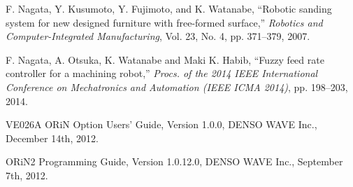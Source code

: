\documentclass{suribt}
\begin{document}
\begin{thebibliography}{}

F. Nagata, Y. Kusumoto, Y. Fujimoto, and K. Watanabe, ``Robotic sanding system for new designed furniture with free-formed surface,''
{\it Robotics and Computer-Integrated Manufacturing},
Vol. 23, No. 4, pp. 371--379, 2007.

F. Nagata, A. Otsuka, K. Watanabe and Maki K. Habib, ``Fuzzy feed rate controller for a machining robot,'' {\it Procs. of the 2014 IEEE International Conference on Mechatronics and Automation (IEEE ICMA 2014)}, pp. 198--203, 2014.


VE026A ORiN Option Users' Guide, Version 1.0.0, DENSO WAVE Inc., December 14th, 2012.

ORiN2 Programming Guide, Version 1.0.12.0, DENSO WAVE Inc., September 7th, 2012.




\end{thebibliography}
\end{document}
